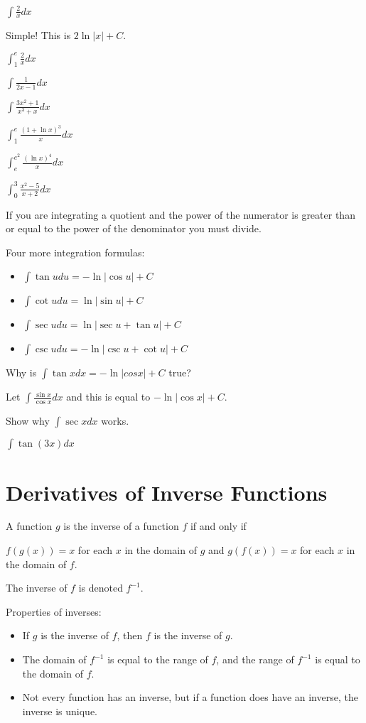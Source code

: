 \documentclass[../bccalc.tex]{subfiles}
\begin{document}
\begin{example}
    $\int \frac{2}{x}dx$

    Simple! This is $2\ln |x|+C$.    
\end{example}

\ex $\int_1^e \frac{2}{x}dx$

\ex $\int \frac{1}{2x-1}dx$

\ex $\int \frac{3x^2+1}{x^3+x}dx$

\ex $\int_1^e \frac{(1+\ln x)^3}{x}dx$

\ex $\int_e^{e^2}\frac{(\ln x)^4}{x}dx$

\ex $\int_0^3 \frac{x^2-5}{x+2}dx$

If you are integrating a quotient and the power of the numerator is greater than or equal to the power of the denominator you must divide.

Four more integration formulas:
\begin{itemize}
    \item $\int \tan u du = -\ln|\cos u|+C$
    \item $\int \cot u du = \ln|\sin u|+C$
    \item $\int \sec u du = \ln|\sec u + \tan u|+C$
    \item $\int \csc u du = -\ln|\csc u + \cot u|+C$
\end{itemize}

\begin{example}
    Why is $\int \tan x dx = -\ln|cos x|+C$ true?

    Let $\int \frac{\sin x}{\cos x}dx$ and this is equal to $-\ln|\cos x|+C$.
\end{example}

\ex Show why $\int \sec x dx$ works.

\ex $\int \tan(3x)dx$

\section{Derivatives of Inverse Functions}
A function $g$ is the inverse of a function $f$ if and only if 

$f(g(x))=x$ for each $x$ in the domain of $g$ and $g(f(x))=x$ for each $x$ in the domain of $f$.

The inverse of $f$ is denoted $f^{-1}$.

Properties of inverses:
\begin{itemize}
    \item If $g$ is the inverse of $f$, then $f$ is the inverse of $g$.
    \item The domain of $f^{-1}$ is equal to the range of $f$, and the range of $f^{-1}$ is equal to the domain of $f$.
    \item Not every function has an inverse, but if a function does have an inverse, the inverse is unique.
\end{itemize}
\end{document}
